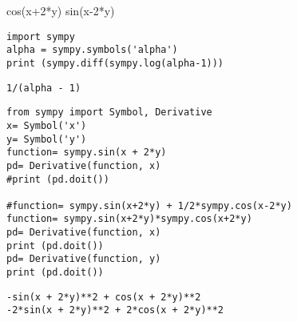 

cos(x+2*y)
sin(x-2*y)


\begin{verbatim}
import sympy
alpha = sympy.symbols('alpha')
print (sympy.diff(sympy.log(alpha-1)))
\end{verbatim}

\begin{verbatim}
1/(alpha - 1)
\end{verbatim}

\begin{verbatim}
from sympy import Symbol, Derivative
x= Symbol('x')
y= Symbol('y')
function= sympy.sin(x + 2*y)
pd= Derivative(function, x)
#print (pd.doit())

#function= sympy.sin(x+2*y) + 1/2*sympy.cos(x-2*y)
function= sympy.sin(x+2*y)*sympy.cos(x+2*y)
pd= Derivative(function, x)
print (pd.doit())
pd= Derivative(function, y)
print (pd.doit())
\end{verbatim}

\begin{verbatim}
-sin(x + 2*y)**2 + cos(x + 2*y)**2
-2*sin(x + 2*y)**2 + 2*cos(x + 2*y)**2
\end{verbatim}




